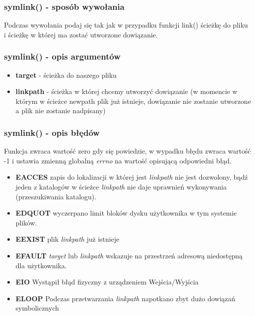 \documentclass{beamer}
\begin{document}
\begin{frame}
	\frametitle{symlink() - sposób wywołania}
Podczas wywołania podaj się tak jak w przypadku funkcji link() ścieżkę do pliku i ścieżkę w której ma zostać utworzone dowiązanie.
\end{frame}

\begin{frame}
	\frametitle{symlink() - opis argumentów}
\begin{itemize}
\item \textbf{target} - ścieżka do naszego pliku
\item \textbf{linkpath} - ścieżka w której chcemy utworzyć dowiązanie (w momencie w którym w ścieżce newpath plik już istnieje, dowiązanie nie zostanie utworzone a plik nie zostanie nadpisany)
\end{itemize}
\end{frame}

\begin{frame}
	\frametitle{symlink() - opis błędów}
Funkcja zwraca wartość zero gdy się powiedzie, w wypadku błędu zwraca wartość -1 i ustawia zmienną globalną \textit{errno} na wartość opisującą odpowiedni błąd.
\begin{itemize}
\item \textbf{EACCES} zapis do lokalizacji w której jest \textit{linkpath} nie jest dozwolony, bądź jeden z katalogów w ścieżce \textit{linkpath} nie daje uprawnień wykonywania (przeszukiwania katalogu).
\item \textbf{EDQUOT} wyczerpano limit bloków dysku użytkownika w tym systemie plików.
\item \textbf{EEXIST} plik \textit{linkpath} już istnieje
\item \textbf{EFAULT} \textit{target} lub  \textit{linkpath} wskazuje na przestrzeń adresową niedostępną dla użytkownika.
\item \textbf{EIO} Wystąpił błąd fizyczny z urządzeniem Wejścia/Wyjścia
\item \textbf{ELOOP} Podczas przetwarzania \textit{linkpath} napotkano zbyt dużo dowiązań symbolicznych
\end{itemize}
\end{frame}
\end{document}
